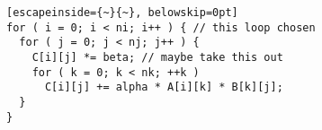\begin{lstlisting}[escapeinside={~}{~}, belowskip=0pt]
for ( i = 0; i < ni; i++ ) { // this loop chosen
  for ( j = 0; j < nj; j++ ) {
    C[i][j] *= beta; // maybe take this out
    for ( k = 0; k < nk; ++k )
      C[i][j] += alpha * A[i][k] * B[k][j];
  }
}
\end{lstlisting}
